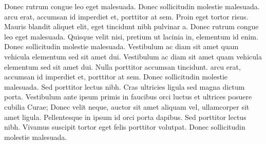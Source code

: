 \documentclass{article}
\begin{document}
Donec rutrum congue leo eget malesuada. Donec sollicitudin molestie malesuada.  arcu erat, accumsan id imperdiet et, porttitor at sem. Proin eget tortor risus. Mauris blandit aliquet elit, eget tincidunt nibh pulvinar a. Donec rutrum congue leo eget malesuada. Quisque velit nisi, pretium ut lacinia in, elementum id enim. Donec sollicitudin molestie malesuada. Vestibulum ac diam sit amet quam vehicula elementum sed sit amet dui. Vestibulum ac diam sit amet quam vehicula elementum sed sit amet dui. Nulla porttitor accumsan tincidunt.  arcu erat, accumsan id imperdiet et, porttitor at sem. Donec sollicitudin molestie malesuada. Sed porttitor lectus nibh. Cras ultricies ligula sed magna dictum porta. Vestibulum ante ipsum primis in faucibus orci luctus et ultrices posuere cubilia Curae; Donec velit neque, auctor sit amet aliquam vel, ullamcorper sit amet ligula. Pellentesque in ipsum id orci porta dapibus. Sed porttitor lectus nibh. Vivamus suscipit tortor eget felis porttitor volutpat. Donec sollicitudin molestie malesuada.\stopmsdata

\endnumbering
\end{document}
